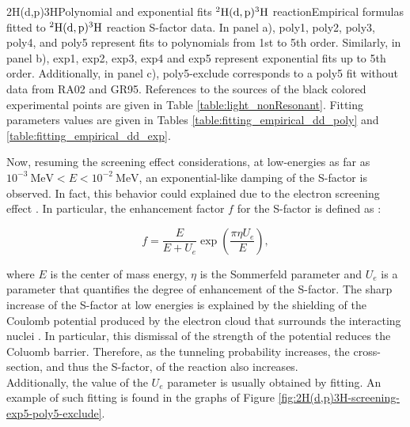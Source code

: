 \documentclass[openany]{book}
\begin{document}
{2H(d,p)3H}{Polynomial and exponential fits $\mathrm{{}^{2}H(d, p){}^{3}H}$ reaction}{Empirical formulas fitted to $\mathrm{{}^{2}H(d, p){}^{3}H}$ reaction S-factor data. In panel a), poly1, poly2, poly3, poly4, and poly5 represent fits to polynomials from 1st to 5th order.  Similarly, in panel b), exp1, exp2, exp3, exp4 and exp5 represent exponential fits up to 5th order. Additionally, in panel c), poly5-exclude corresponds to a poly5 fit without data from RA02 and GR95. References to the sources of the black colored experimental points are given in Table \ref{table:light_nonResonant}. Fitting parameters values are given in Tables \ref{table:fitting_empirical_dd_poly} and \ref{table:fitting_empirical_dd_exp}.}



Now, resuming the screening effect considerations, at low-energies as far as $ \mathrm{10^{-3} \ MeV}  <  E<\mathrm{10^{-2} \ MeV}$, an exponential-like damping of the S-factor is observed. In fact, this  behavior could explained due to the electron screening effect \cite{raiola_migliardi_gyurky_aliotta_formicola_bonetti_broggini_campajola_corvisiero_costantini_et_2002}. In particular, the enhancement factor $f$ for the S-factor is defined as \cite{assenbaum_langanke_rolfs_1987}: 

\begin{equation}\label{eq:screening_factor}
	f = \frac{E}{E + U_e}\exp{\left(\frac{\pi \eta U_e}{E}\right)},
\end{equation}

where $E$ is the center of mass energy, $\eta$ is the Sommerfeld parameter and $U_e$ is a parameter that quantifies the degree of enhancement of the S-factor. The sharp increase of the S-factor at low energies is explained by the shielding of the Coulomb potential produced by the electron cloud that surrounds the interacting nuclei \cite{assenbaum_langanke_rolfs_1987}. In particular, this dismissal of the strength of the potential reduces the Coluomb barrier. Therefore, as the tunneling probability increases, the cross-section, and thus the S-factor, of the reaction also increases. \\

Additionally, the value of the $U_e$ parameter is usually obtained by fitting. An example of such fitting is found in the graphs of Figure \ref{fig:2H(d,p)3H-screening-exp5-poly5-exclude}.
\end{document}
